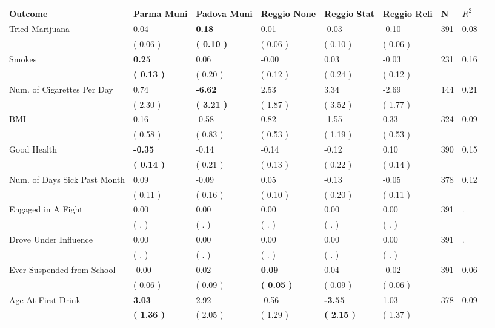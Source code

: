 \begin{tabular}{L{6.2cm} C{1.8cm} C{1.8cm} C{1.8cm} C{1.8cm} C{1.8cm} C{1.8cm} C{0.3cm} C{0.3cm}}
\toprule
 \textbf{Outcome} & \textbf{Parma Muni} & \textbf{Padova Muni} & \textbf{Reggio None} & \textbf{Reggio Stat} & \textbf{Reggio Reli} & \textbf{N} & \textbf{$ R^2$} \\
\midrule
Tried Marijuana &      0.04 & \textbf{     0.18} &      0.01 &     -0.03 &     -0.10  & 391 &       0.08 \\ 
 & (     0.06 ) & \textbf{(     0.10 )} & (     0.06 ) & (     0.10 ) & (     0.06 )  & \\
Smokes & \textbf{     0.25} &      0.06 &     -0.00 &      0.03 &     -0.03  & 231 &       0.16 \\ 
 & \textbf{(     0.13 )} & (     0.20 ) & (     0.12 ) & (     0.24 ) & (     0.12 )  & \\
Num. of Cigarettes Per Day &      0.74 & \textbf{    -6.62} &      2.53 &      3.34 &     -2.69  & 144 &       0.21 \\ 
 & (     2.30 ) & \textbf{(     3.21 )} & (     1.87 ) & (     3.52 ) & (     1.77 )  & \\
BMI &      0.16 &     -0.58 &      0.82 &     -1.55 &      0.33  & 324 &       0.09 \\ 
 & (     0.58 ) & (     0.83 ) & (     0.53 ) & (     1.19 ) & (     0.53 )  & \\
Good Health & \textbf{    -0.35} &     -0.14 &     -0.14 &     -0.12 &      0.10  & 390 &       0.15 \\ 
 & \textbf{(     0.14 )} & (     0.21 ) & (     0.13 ) & (     0.22 ) & (     0.14 )  & \\
Num. of Days Sick Past Month &      0.09 &     -0.09 &      0.05 &     -0.13 &     -0.05  & 378 &       0.12 \\ 
 & (     0.11 ) & (     0.16 ) & (     0.10 ) & (     0.20 ) & (     0.11 )  & \\
Engaged in A Fight &      0.00 &      0.00 &      0.00 &      0.00 &      0.00  & 391 &          . \\ 
 & (        . ) & (        . ) & (        . ) & (        . ) & (        . )  & \\
Drove Under Influence &      0.00 &      0.00 &      0.00 &      0.00 &      0.00  & 391 &          . \\ 
 & (        . ) & (        . ) & (        . ) & (        . ) & (        . )  & \\
Ever Suspended from School &     -0.00 &      0.02 & \textbf{     0.09} &      0.04 &     -0.02  & 391 &       0.06 \\ 
 & (     0.06 ) & (     0.09 ) & \textbf{(     0.05 )} & (     0.09 ) & (     0.06 )  & \\
Age At First Drink & \textbf{     3.03} &      2.92 &     -0.56 & \textbf{    -3.55} &      1.03  & 378 &       0.09 \\ 
 & \textbf{(     1.36 )} & (     2.05 ) & (     1.29 ) & \textbf{(     2.15 )} & (     1.37 )  & \\
\bottomrule
\end{tabular}

